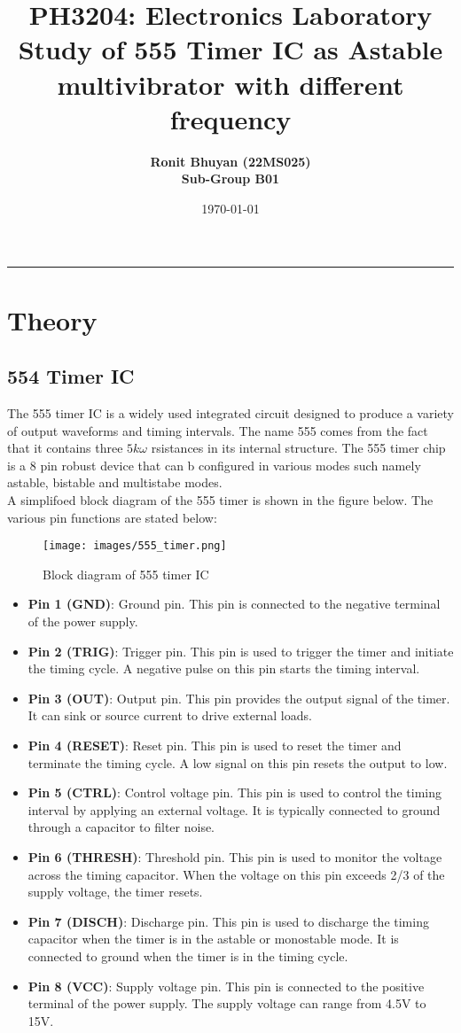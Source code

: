 \documentclass[12pt]{article}
\title{
  \vspace{-2cm}
  \Huge \textbf{PH3204: Electronics Laboratory} \\[0.4cm]
  \Large \textbf{ Study of 555 Timer IC as Astable multivibrator with different frequency}
}
\author{
  \textbf{Ronit Bhuyan (22MS025)} \\[0.2cm]
  \textbf{Sub-Group B01}
}
\date{\today}
\begin{document}
\maketitle

\tableofcontents
\noindent\rule{\textwidth}{0.4pt}
\newpage

\section{Theory}
\subsection{554 Timer IC}
The 555 timer IC is a widely used integrated circuit designed to produce a variety of output waveforms and timing intervals. The name 555 comes from the fact that it contains three $5 k\omega$ rsistances in its internal structure. The 555 timer chip is a 8 pin robust device that can b configured in various modes such namely astable, bistable and multistabe modes. \\
A simplifoed block diagram of the 555 timer is shown in the figure below. The various pin functions are stated below:
\begin{figure}
    \centering
    \texttt{[image: images/555\_timer.png]}
    \caption{Block diagram of 555 timer IC}
    \label{fig:555_timer_block_diagram}
\end{figure}
\begin{itemize}
    \item \textbf{Pin 1 (GND)}: Ground pin. This pin is connected to the negative terminal of the power supply.
    \item \textbf{Pin 2 (TRIG)}: Trigger pin. This pin is used to trigger the timer and initiate the timing cycle. A negative pulse on this pin starts the timing interval.
    \item \textbf{Pin 3 (OUT)}: Output pin. This pin provides the output signal of the timer. It can sink or source current to drive external loads.
    \item \textbf{Pin 4 (RESET)}: Reset pin. This pin is used to reset the timer and terminate the timing cycle. A low signal on this pin resets the output to low.
    \item \textbf{Pin 5 (CTRL)}: Control voltage pin. This pin is used to control the timing interval by applying an external voltage. It is typically connected to ground through a capacitor to filter noise.
    \item \textbf{Pin 6 (THRESH)}: Threshold pin. This pin is used to monitor the voltage across the timing capacitor. When the voltage on this pin exceeds 2/3 of the supply voltage, the timer resets.
    \item \textbf{Pin 7 (DISCH)}: Discharge pin. This pin is used to discharge the timing capacitor when the timer is in the astable or monostable mode. It is connected to ground when the timer is in the timing cycle.   
    \item \textbf{Pin 8 (VCC)}: Supply voltage pin. This pin is connected to the positive terminal of the power supply. The supply voltage can range from 4.5V to 15V.
\end{itemize} 
\end{document}
